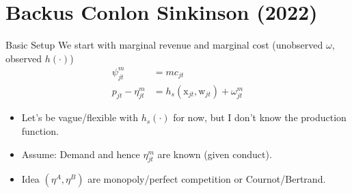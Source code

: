 \documentclass[xcolor=pdftex,dvipsnames,table,mathserif,aspectratio=169]{beamer}
\begin{document}









\section{Backus Conlon Sinkinson (2022)}




\begin{frame}{Basic Setup}
We start with marginal revenue and marginal cost (unobserved $\omega$, observed $h(\cdot)$)
\begin{align*}
\psi_{jt}^{m} &= mc_{jt} \\
p_{jt} -\eta_{jt}^m &= h_s(\textrm{x}_{jt},\textrm{w}_{jt})  + \omega_{jt}^m
\end{align*}
\begin{itemize}
\item Let's be vague/flexible with $h_s(\cdot)$ for now, but I don't know the production function.
\item Assume: Demand and hence $\eta_{jt}^{m}$ are \alert{known (given conduct)}.\\
\item Idea $(\eta^{A},\eta^{B})$ are monopoly/perfect competition or Cournot/Bertrand.
\end{itemize}
\end{frame}
\end{document}
